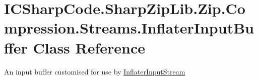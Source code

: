 \hypertarget{class_i_c_sharp_code_1_1_sharp_zip_lib_1_1_zip_1_1_compression_1_1_streams_1_1_inflater_input_buffer}{}\section{I\+C\+Sharp\+Code.\+Sharp\+Zip\+Lib.\+Zip.\+Compression.\+Streams.\+Inflater\+Input\+Buffer Class Reference}
\label{class_i_c_sharp_code_1_1_sharp_zip_lib_1_1_zip_1_1_compression_1_1_streams_1_1_inflater_input_buffer}


An input buffer customised for use by \hyperlink{class_i_c_sharp_code_1_1_sharp_zip_lib_1_1_zip_1_1_compression_1_1_streams_1_1_inflater_input_stream}{Inflater\+Input\+Stream}  



